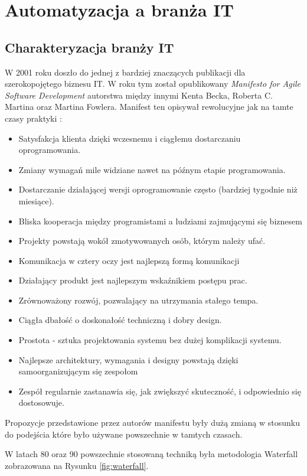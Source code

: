 \section{Automatyzacja a branża IT}
\subsection{Charakteryzacja branży IT}
W 2001 roku doszło do jednej z bardziej znaczących publikacji dla szerokopojętego biznesu IT. W roku tym został opublikowany \textit{Manifesto for Agile Software Development} autorstwa między innymi Kenta Becka, Roberta C. Martina oraz Martina Fowlera. Manifest ten opisywał rewolucyjne jak na tamte czasy praktyki \cite{AgileManifesto}:
\begin{itemize}
    \item Satysfakcja klienta dzięki wczesnemu i ciągłemu dostarczaniu oprogramowania.
    \item Zmiany wymagań mile widziane nawet na późnym etapie programowania.
    \item Dostarczanie działającej wersji oprogramowanie często (bardziej tygodnie niż miesiące).
    \item Bliska kooperacja między programistami a ludziami zajmującymi się biznesem
    \item Projekty powstają wokół zmotywowanych osób, którym należy ufać.
    \item Komunikacja w cztery oczy jest najlepszą formą komunikacji
    \item Działający produkt jest najlepszym wskaźnikiem postępu prac.
    \item Zrównoważony rozwój, pozwalający na utrzymania stałego tempa.
    \item Ciągła dbałość o doskonałość techniczną i dobry design.
    \item Prostota - sztuka projektowania systemu bez dużej komplikacji systemu.
    \item Najlepsze architektury, wymagania i designy powstają dzięki samoorganizującym się zespołom
    \item Zespół regularnie zastanawia się, jak zwiększyć skuteczność, i odpowiednio się dostosowuje. 
\end{itemize}
Propozycje przedstawione przez autorów manifestu były dużą zmianą w stosunku do podejścia które było używane powszechnie w tamtych czasach.
\par
W latach 80 oraz 90 powszechnie stosowaną techniką była metodologia Waterfall zobrazowana na Rysunku \ref{fig:waterfall}.
